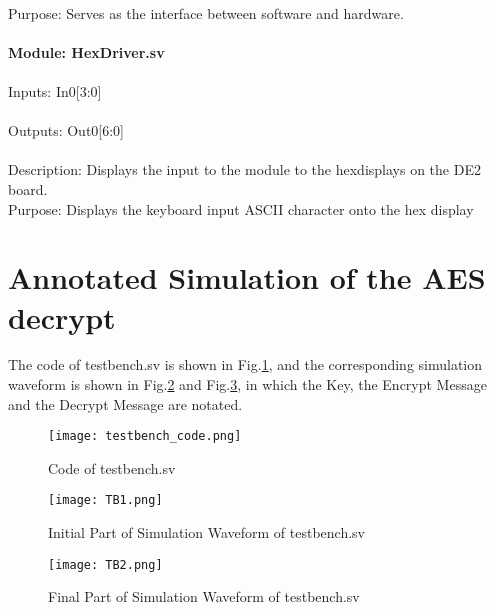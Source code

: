 \documentclass[11pt]{article}
\begin{document}
\\Purpose: Serves as the interface between software and hardware.
\\
\\
\textbf{Module: HexDriver.sv}\\
\\
Inputs: In0[3:0] \\
\\
Outputs: Out0[6:0]\\
\\
Description: Displays the input to the module to the hexdisplays on the DE2 board.\\
Purpose: Displays the keyboard input ASCII character onto the hex display


\section{Annotated Simulation of the AES decrypt}
The code of testbench.sv is shown in Fig.\ref{3_1}, and the corresponding simulation waveform is shown in Fig.\ref{3_2} and Fig.\ref{3_3}, in which the Key, the Encrypt Message and the Decrypt Message are notated.
\begin{figure}[ht]
    \centering
    \texttt{[image: testbench\_code.png]}
    \caption{Code of testbench.sv}
    \label{3_1}
\end{figure}
\begin{figure}[ht]
    \centering
    \texttt{[image: TB1.png]}
    \caption{Initial Part of Simulation Waveform of testbench.sv}
    \label{3_2}
\end{figure}
\begin{figure}[ht]
    \centering
    \texttt{[image: TB2.png]}
    \caption{Final Part of Simulation Waveform of testbench.sv}
    \label{3_3}
\end{figure}
\end{document}
